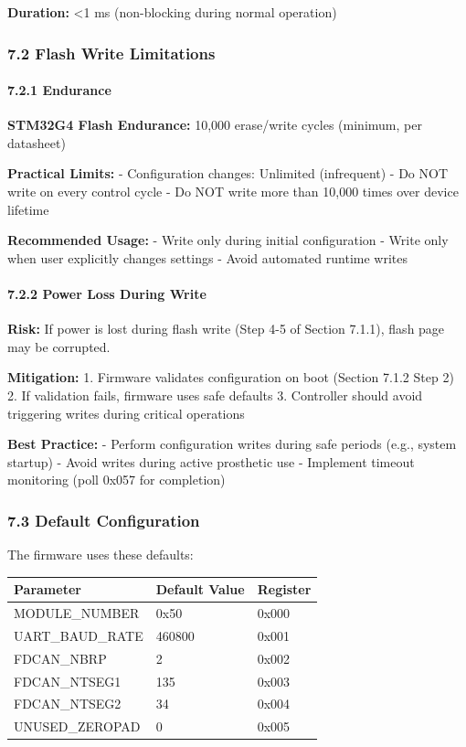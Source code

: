 \documentclass[
  11pt,
]{article}
\newcounter{none} %
\begin{document}
\textbf{Duration:} \textless1 ms (non-blocking during normal operation)

\subsubsection{7.2 Flash Write
Limitations}\label{flash-write-limitations}

\paragraph{7.2.1 Endurance}\label{endurance}

\textbf{STM32G4 Flash Endurance:} 10,000 erase/write cycles (minimum,
per datasheet)

\textbf{Practical Limits:} - Configuration changes: Unlimited
(infrequent) - Do NOT write on every control cycle - Do NOT write more
than 10,000 times over device lifetime

\textbf{Recommended Usage:} - Write only during initial configuration -
Write only when user explicitly changes settings - Avoid automated
runtime writes

\paragraph{7.2.2 Power Loss During Write}\label{power-loss-during-write}

\textbf{Risk:} If power is lost during flash write (Step 4-5 of Section
7.1.1), flash page may be corrupted.

\textbf{Mitigation:} 1. Firmware validates configuration on boot
(Section 7.1.2 Step 2) 2. If validation fails, firmware uses safe
defaults 3. Controller should avoid triggering writes during critical
operations

\textbf{Best Practice:} - Perform configuration writes during safe
periods (e.g., system startup) - Avoid writes during active prosthetic
use - Implement timeout monitoring (poll 0x057 for completion)

\subsubsection{7.3 Default Configuration}\label{default-configuration}

The firmware uses these defaults:

{\def\LTcaptype{none} %
\begin{longtable}[]{@{}lll@{}}
\toprule\noalign{}
Parameter & Default Value & Register \\
\midrule\noalign{}
\endhead
\bottomrule\noalign{}
\endlastfoot
MODULE\_NUMBER & 0x50 & 0x000 \\
UART\_BAUD\_RATE & 460800 & 0x001 \\
FDCAN\_NBRP & 2 & 0x002 \\
FDCAN\_NTSEG1 & 135 & 0x003 \\
FDCAN\_NTSEG2 & 34 & 0x004 \\
UNUSED\_ZEROPAD & 0 & 0x005 \\
\end{longtable}
}
\end{document}
